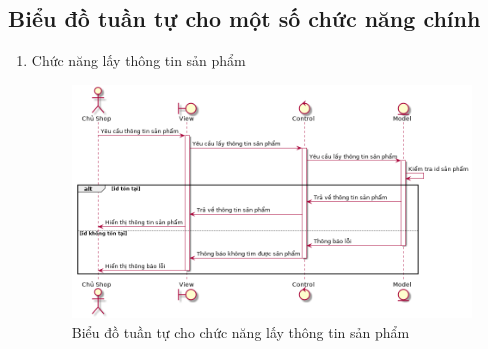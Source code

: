 \subsection{Biểu đồ tuần tự cho một số chức năng chính}
\begin{enumerate}[label=\textbf{\alph*)}]
    \item Chức năng lấy thông tin sản phẩm
    \begin{figure}[h!]
        \includegraphics[scale=0.5]{fig/s_get_product_info.png}
        \caption{Biểu đồ tuần tự cho chức năng lấy thông tin sản phẩm}
    \end{figure}


\end{enumerate}
